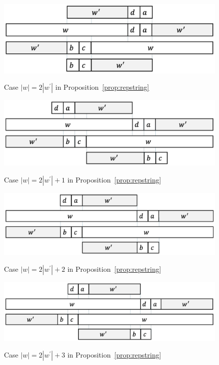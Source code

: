 \begin{figure}[t]
\begin{center}
  \includegraphics[scale=0.345]{figs/w=2w_1.pdf}
  \caption{Case $|w| = 2|w^{\prime}|$ in Proposition~\ref{prop:repstring}}\label{fig:prop_pic14}
  \bigskip
  \includegraphics[scale=0.345]{figs/w=2w_1+1.pdf}
  \caption{Case $|w| = 2|w^{\prime}| + 1$ in Proposition~\ref{prop:repstring}}\label{fig:prop_pic13}
  \bigskip
  \includegraphics[scale=0.345]{figs/w=2w_1+2.pdf}
  \caption{Case $|w| = 2|w^{\prime}| + 2$ in Proposition~\ref{prop:repstring}}\label{fig:prop_pic12}
  \bigskip
  \includegraphics[scale=0.345]{figs/w=2w_1+3.pdf}
  \caption{Case $|w| = 2|w^{\prime}| + 3$ in Proposition~\ref{prop:repstring}}\label{fig:prop_pic11}
\end{center}
\end{figure}

